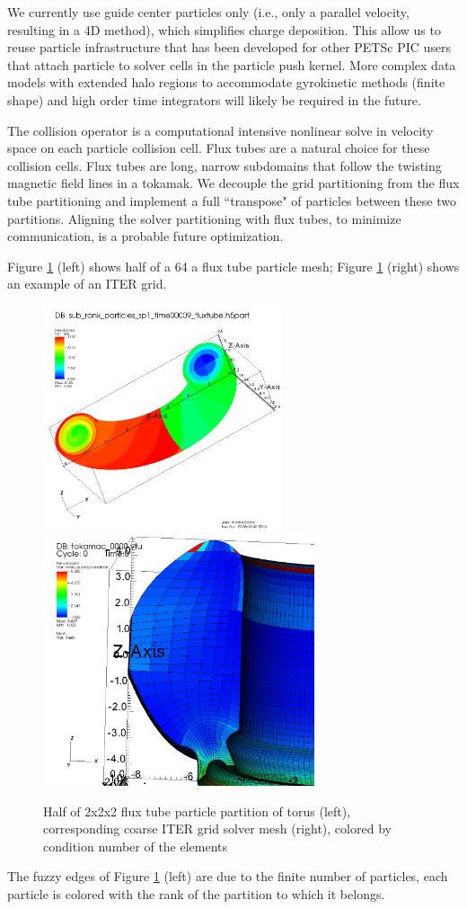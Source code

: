 \documentclass[review]{siamart}
\begin{document}
We currently use guide center particles only (i.e., only a parallel velocity, resulting in a 4D method), which simplifies charge deposition.
This allow us to reuse particle infrastructure that has been developed for other PETSc PIC users \cite{may2014ptatin} that attach particle to solver cells in the particle push kernel.
More complex data models with extended halo regions to accommodate gyrokinetic methods (finite shape) and high order time integrators will likely be required in the future.

The collision operator is a computational intensive nonlinear solve in velocity space on each particle collision cell.
Flux tubes are a natural choice for these collision cells.
Flux tubes are long, narrow subdomains that follow the twisting magnetic field lines in a tokamak.
We decouple the grid partitioning from the flux tube partitioning and implement a full ``transpose" of particles between these two partitions.
Aligning the solver partitioning with flux tubes, to minimize communication, is a probable future optimization.

Figure \ref{fig:cross} (left) shows half of a 64 a flux tube particle mesh; Figure \ref{fig:cross} (right) shows an example of an ITER grid.
\begin{figure}[h!]
   \centering
   \includegraphics[width=70mm]{half_fluxtubes_64.jpeg} 
    \includegraphics[width=80mm]{half_half_grid_mesh.jpeg} 
   \caption{Half of  2x2x2 flux tube particle partition of torus (left), corresponding coarse ITER grid solver mesh (right), colored by condition number of the elements}
   \label{fig:cross}
\end{figure}
The fuzzy edges of Figure \ref{fig:cross} (left) are due to the finite number of particles, each particle is colored with the rank of the partition to which it belongs.
\end{document}
